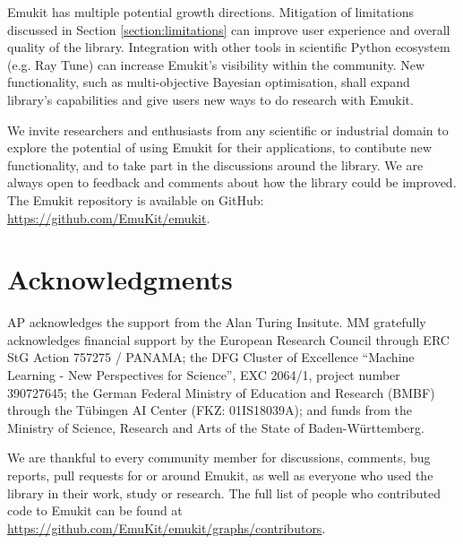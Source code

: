 Emukit has multiple potential growth directions. Mitigation of limitations discussed in Section \ref{section:limitations} can improve user experience and overall quality of the library. Integration with other tools in scientific Python ecosystem (e.g. Ray Tune) can increase Emukit's visibility within the community. New functionality, such as multi-objective Bayesian optimisation, shall expand library's capabilities and give users new ways to do research with Emukit.

We invite researchers and enthusiasts from any scientific or industrial domain to explore the potential of using Emukit for their applications, to contibute new functionality, and to take part in the discussions around the library. We are always open to feedback and comments about how the library could be improved. The Emukit repository is available on GitHub: \url{https://github.com/EmuKit/emukit}.

\section{Acknowledgments}
AP acknowledges the support from the Alan Turing Insitute.  MM gratefully acknowledges financial support by the European Research Council through ERC StG Action 757275 / PANAMA; the DFG Cluster of Excellence “Machine Learning - New Perspectives for Science”, EXC 2064/1, project number 390727645; the German Federal Ministry of Education and Research (BMBF) through the T\"{u}bingen AI Center (FKZ: 01IS18039A); and funds from the Ministry of Science, Research and Arts of the State of Baden-W\"{u}rttemberg.

We are thankful to every community member for discussions, comments, bug reports, pull requests for or around Emukit, as well as everyone who used the library in their work, study or research. The full list of people who contributed code to Emukit can be found at \url{https://github.com/EmuKit/emukit/graphs/contributors}.
